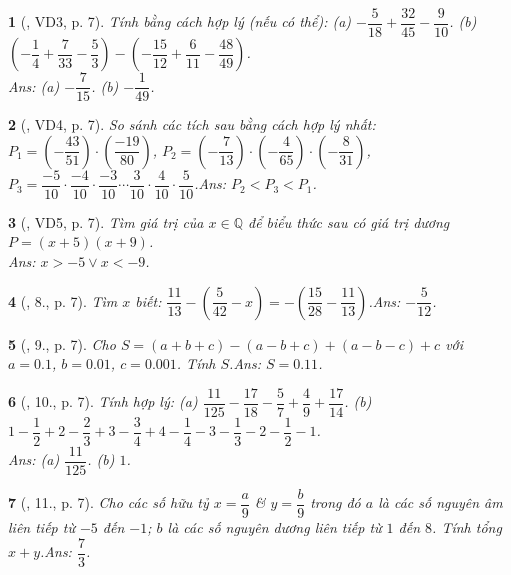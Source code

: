 \documentclass{article}
\newtheorem{baitoan}{}
\begin{document}
\begin{baitoan}[\cite{Tuyen_Toan_7}, VD3, p. 7]
	Tính bằng cách hợp lý (nếu có thể): (a) $-\dfrac{5}{18} + \dfrac{32}{45} - \dfrac{9}{10}$. (b) $\left(-\dfrac{1}{4} + \dfrac{7}{33} - \dfrac{5}{3}\right) - \left(-\dfrac{15}{12} + \dfrac{6}{11} - \dfrac{48}{49}\right)$.\\\mbox{}\hfill{\sf Ans: (a) $-\dfrac{7}{15}$. (b) $-\dfrac{1}{49}$.}
\end{baitoan}

\begin{baitoan}[\cite{Tuyen_Toan_7}, VD4, p. 7]
	So sánh các tích sau bằng cách hợp lý nhất: $P_1 = \left(-\dfrac{43}{51}\right)\cdot\left(\dfrac{-19}{80}\right)$, $P_2 = \left(-\dfrac{7}{13}\right)\cdot\left(-\dfrac{4}{65}\right)\cdot\left(-\dfrac{8}{31}\right)$, $P_3 = \dfrac{-5}{10}\cdot\dfrac{-4}{10}\cdot\dfrac{-3}{10}\cdots\dfrac{3}{10}\cdot\dfrac{4}{10}\cdot\dfrac{5}{10}$.\hfill{\sf Ans: $P_2 < P_3 < P_1$.}
\end{baitoan}

\begin{baitoan}[\cite{Tuyen_Toan_7}, VD5, p. 7]
	Tìm giá trị của $x\in\mathbb{Q}$ để biểu thức sau có giá trị dương  $P = (x + 5)(x + 9)$.\\\mbox{}\hfill{\sf Ans: $x > -5\lor x < -9$.}
\end{baitoan}

\begin{baitoan}[\cite{Tuyen_Toan_7}, 8., p. 7]
	Tìm $x$ biết: $\dfrac{11}{13} - \left(\dfrac{5}{42} - x\right) = -\left(\dfrac{15}{28} - \dfrac{11}{13}\right)$.\hfill{\sf Ans: $-\dfrac{5}{12}$.}
\end{baitoan}

\begin{baitoan}[\cite{Tuyen_Toan_7}, 9., p. 7]
	Cho $S = (a + b + c) - (a - b + c) + (a - b - c) + c$ với $a = 0.1$, $b = 0.01$, $c = 0.001$. Tính $S$.\hfill{\sf Ans: $S = 0.11$.}
\end{baitoan}

\begin{baitoan}[\cite{Tuyen_Toan_7}, 10., p. 7]
	Tính hợp lý: (a) $\dfrac{11}{125} - \dfrac{17}{18} - \dfrac{5}{7} + \dfrac{4}{9} + \dfrac{17}{14}$. (b) $1 - \dfrac{1}{2} + 2 - \dfrac{2}{3} + 3 - \dfrac{3}{4} + 4 - \dfrac{1}{4} - 3 - \dfrac{1}{3} - 2 - \dfrac{1}{2} - 1$.\\\mbox{}\hfill{\sf Ans: (a) $\dfrac{11}{125}$. (b) $1$.}
\end{baitoan}

\begin{baitoan}[\cite{Tuyen_Toan_7}, 11., p. 7]
	Cho các số hữu tỷ $x = \dfrac{a}{9}$ \& $y = \dfrac{b}{9}$ trong đó $a$ là các số nguyên âm liên tiếp từ $-5$ đến $-1$; $b$ là các số nguyên dương liên tiếp từ $1$ đến $8$. Tính tổng $x + y$.\hfill{\sf Ans: $\dfrac{7}{3}$.}
\end{baitoan}
\end{document}
